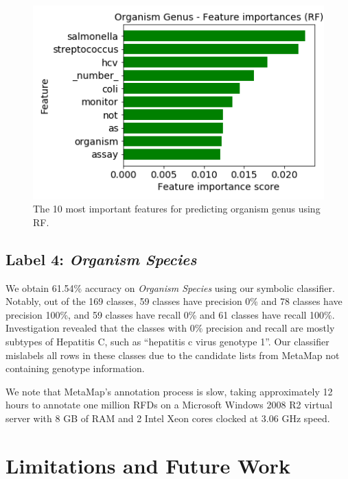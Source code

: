 \documentclass[sigconf]{acmart}
\begin{document}
\begin{figure}
    \centering
    \includegraphics[width=\linewidth]{ogml_rf_alt_features.png}
    \caption{The 10 most important features for predicting organism genus using RF.}
    \label{fig:ogml_rf_alt_features}
\end{figure}

\subsection{Label 4: \textit{Organism Species}}

We obtain 61.54\% accuracy on \textit{Organism Species} using our symbolic classifier. Notably, out of the 169 classes, 59 classes have precision 0\% and 78 classes have precision 100\%, and 59 classes have recall 0\% and 61 classes have recall 100\%. Investigation revealed that the classes with 0\% precision and recall are mostly subtypes of Hepatitis C, such as ``hepatitis c virus genotype 1''. Our classifier mislabels all rows in these classes due to the candidate lists from MetaMap not containing genotype information.

We note that MetaMap's annotation process is slow, taking approximately 12 hours to annotate one million RFDs on a Microsoft Windows 2008 R2 virtual server with 8 GB of RAM and 2 Intel Xeon cores clocked at 3.06 GHz speed.

\section{Limitations and Future Work} \label{limitations_and_future_work}
\end{document}
